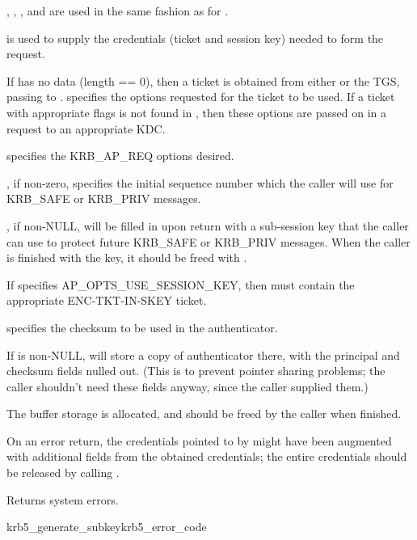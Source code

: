 , , ,
and  are used in the same fashion as for
.

 is used to supply the credentials (ticket and session
key) needed to form the request.

If  has no data (length == 0), then a
ticket is obtained from either  or the TGS, passing
 to . 
 specifies the options requested for the ticket
to be used. If a ticket with appropriate flags is not found in
, then these options are passed on in a request to an
appropriate KDC.

 specifies the KRB_AP_REQ options desired.

, if non-zero, specifies the initial sequence number
which the caller will use for KRB_SAFE or KRB_PRIV messages.

, if non-NULL, will be filled in upon return with a 
sub-session key that the caller can use to protect future KRB_SAFE or
KRB_PRIV messages.  When the caller is finished with the key, it should
be freed with .

If  specifies AP_OPTS_USE_SESSION_KEY, then
 must contain the appropriate
ENC-TKT-IN-SKEY ticket.

 specifies the checksum to be used in the
authenticator.

If  is non-NULL, 
will store
a copy of authenticator there, with the principal and checksum fields
nulled out.  (This is to prevent pointer sharing problems; the caller
shouldn't need these fields anyway, since the caller supplied them.)

The  buffer storage is allocated, and should be freed
by the caller when finished.

On an error return, the credentials pointed to by 
might have been augmented with additional fields from the obtained
credentials; the entire credentials should be released by calling
.

Returns system errors.

\begin{funcdecl}{krb5_generate_subkey}{krb5_error_code}{\funcin}
\funcout
{}
\end{funcdecl}

